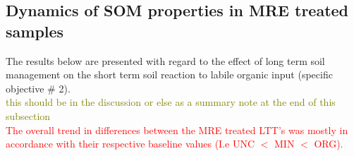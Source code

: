 \documentclass[12pt]{report}
\newcommand{\myRed}[1]{\textcolor{red}{#1}} %
\newcommand{\myGreen}[1]{\textcolor{olive}{#1}} %
\begin{document}
		
	
\subsection{Dynamics of SOM properties in MRE treated samples}
	The results below are presented with regard to the effect of long term soil management on the short term soil reaction to labile organic input (specific objective \# 2).\\

	\myGreen{this should be in the discussion or else as a summary note at the end of this subsection}\\	
	\myRed{ The overall trend in differences between the \myRed{MRE treated} LTT’s was mostly in accordance with their respective baseline values (I.e UNC $ < $ MIN $ < $ ORG). 
	}
\end{document}
